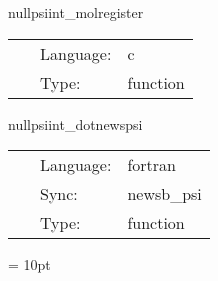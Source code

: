 \vspace{5mm}


\hspace{5mm} nullpsiint\_molregister 

\hspace{5mm}{\it register variables for mol } 


\hspace{5mm}

 \begin{tabular*}{160mm}{cll} 
~ & Language:  & c \\ 
~ & Type:  & function \\ 
\end{tabular*} 


\vspace{5mm}


\hspace{5mm} nullpsiint\_dotnewspsi 

\hspace{5mm}{\it calculate the integral of psi4 } 


\hspace{5mm}

 \begin{tabular*}{160mm}{cll} 
~ & Language:  & fortran \\ 
~ & Sync:  & newsb\_psi \\ 
~ & Type:  & function \\ 
\end{tabular*} 



\vspace{5mm}\parskip = 10pt 
